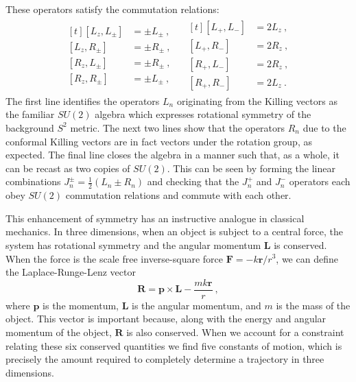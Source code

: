 \documentclass[12pt]{article}
\begin{document}
These operators satisfy the commutation relations:
\begin{equation}
	\begin{split}\begin{aligned}[t]
		[L_z, L_{\pm}] &= \pm L_{\pm}~, \quad \\
		[L_z, R_{\pm}] &= \pm R_{\pm}~, \quad \\
		[R_z, L_{\pm}] &= \pm R_{\pm}~, \quad \\
		[R_z, R_{\pm}] &= \pm L_{\pm}~, \quad 
	\end{aligned}
	\begin{aligned}[t]
		[L_{+}, L_{-}]&= 2 L_z~, \\
			[L_{+}, R_{-}]&= 2 R_z~, \\
			[R_{+}, L_{-}]&= 2 R_z~,\\
			[R_{+}, R_{-}]&= 2 L_z~.
	\end{aligned}\end{split}
\label{eq:su2su2}
\end{equation}
The first line identifies the operators $L_n$ originating from the Killing vectors as the familiar $SU(2)$ algebra which expresses rotational symmetry of the background $S^2$ metric. The next two lines show that the operators $R_n$ due to the conformal Killing vectors are in fact vectors under the rotation group, as expected. 
The final line closes the algebra in a manner such that, as a whole, it can be recast as two copies of $SU(2)$. This can be seen by forming the linear combinations $J^\pm_n = \frac{1}{2}\left(L_n \pm R_n\right)$ and checking that the $J^+_n$ and $J^-_n$ operators each obey $SU(2)$ commutation relations and commute with each other. 

This enhancement of symmetry has an instructive analogue in classical mechanics.  In three dimensions, when an object is subject to a central force, the system has rotational symmetry and the angular momentum $\mathbf{L}$ is conserved.  When the force is the scale free inverse-square force $\mathbf{F} = - k \mathbf{r} / r^3$, we can define the Laplace-Runge-Lenz vector~\cite{doi:10.2991/jnmp.2003.10.3.6} 
\begin{equation}
	\mathbf{R} = \mathbf{p} \times \mathbf{L} - \frac{m k \mathbf{r}}{r}~,
\end{equation}
where $\mathbf{p}$ is the momentum, $\mathbf{L}$ is the angular momentum, and $m$ is the mass of the object.  This vector is important because, along with the energy and angular momentum of the object, $\mathbf{R}$ is also conserved.  When we account for a constraint relating these six conserved quantities we find five constants of motion, which is precisely the amount required to completely determine a trajectory in three dimensions.
\end{document}
